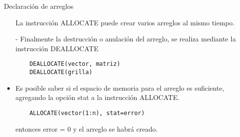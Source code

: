 \begin{frame}[fragile]{Declaración de arreglos}
 \begin{itemize}[<+(0)->]
  \item [] La instrucción ALLOCATE puede crear varios arreglos al mismo tiempo.
  \item [-] Finalmente la destrucción o anulación del arreglo, se realiza mediante la instrucción DEALLOCATE
  \vspace{0.2cm}
  \item [] 
    \begin{verbatim}
    DEALLOCATE(vector, matriz)
    DEALLOCATE(grilla)
    \end{verbatim}
  \item Es posible saber si el espacio de memoria para el arreglo es suficiente, agregando la opción stat a la instrucción ALLOCATE.
  \vspace{0.2cm}
  \item [] 
    \begin{verbatim}
    ALLOCATE(vector(1:n), stat=error)
    \end{verbatim}
  \item [] entonces error = 0 y el arreglo se habrá creado.    
 \end{itemize}
\end{frame}